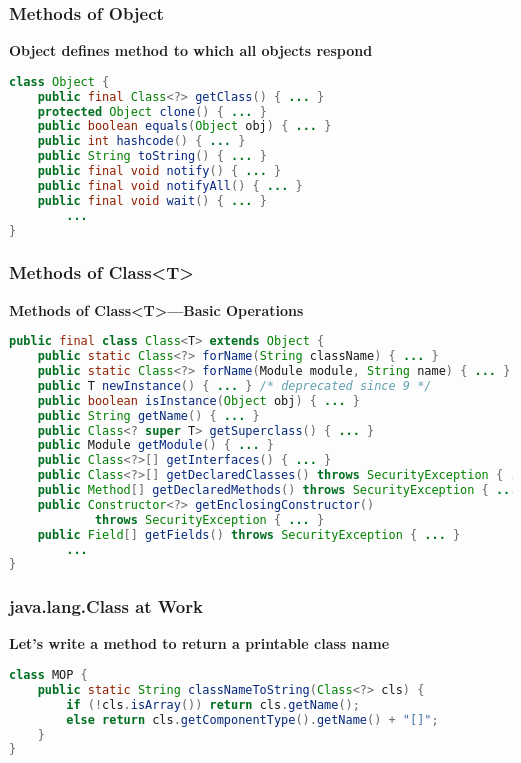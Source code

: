 \subsubsection{Methods of Object}

\textbf{Object defines method to which all objects respond}

\begin{lstlisting}[language=Java]
class Object {
	public final Class<?> getClass() { ... }
	protected Object clone() { ... }
	public boolean equals(Object obj) { ... }
	public int hashcode() { ... }
	public String toString() { ... }
	public final void notify() { ... }
	public final void notifyAll() { ... }
	public final void wait() { ... }
		...
}
\end{lstlisting}

\subsubsection{Methods of Class<T>}

\textbf{Methods of Class<T>—Basic Operations}

\begin{lstlisting}[language=Java]
public final class Class<T> extends Object {
	public static Class<?> forName(String className) { ... }
	public static Class<?> forName(Module module, String name) { ... }
	public T newInstance() { ... } /* deprecated since 9 */
	public boolean isInstance(Object obj) { ... }
	public String getName() { ... }
	public Class<? super T> getSuperclass() { ... }
	public Module getModule() { ... }
	public Class<?>[] getInterfaces() { ... }
	public Class<?>[] getDeclaredClasses() throws SecurityException { ... }
	public Method[] getDeclaredMethods() throws SecurityException { ... }
	public Constructor<?> getEnclosingConstructor()
			throws SecurityException { ... }
	public Field[] getFields() throws SecurityException { ... }
		...
}
\end{lstlisting}

\subsubsection{java.lang.Class at Work}

\textbf{Let's write a method to return a printable class name}

\begin{lstlisting}[language=Java]
class MOP {
	public static String classNameToString(Class<?> cls) {
		if (!cls.isArray()) return cls.getName();
		else return cls.getComponentType().getName() + "[]";
	}
}
\end{lstlisting}

